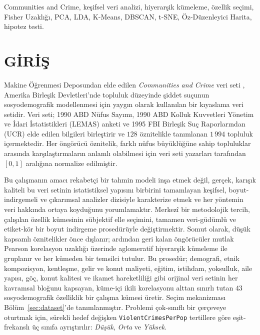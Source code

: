 \documentclass{ieeeaccess}
\begin{document}
\begin{keywords}
Communities and Crime, keşifsel veri analizi, hiyerarşik kümeleme, özellik seçimi, Fisher Uzaklığı, PCA, LDA, K-Means, DBSCAN, t-SNE, Öz-Düzenleyici Harita, hipotez testi.
\end{keywords}

\titlepgskip=-21pt
\maketitle

\section{GİRİŞ}
\label{sec:introduction}
 Makine Öğrenmesi Deposundan elde edilen \emph{Communities and Crime} veri seti \cite{uciccrime}, Amerika Birleşik Devletleri'nde topluluk düzeyinde şiddet suçunun sosyodemografik modellenmesi için yaygın olarak kullanılan bir kıyaslama veri setidir. Veri seti; 1990 ABD Nüfus Sayımı, 1990 ABD Kolluk Kuvvetleri Yönetim ve İdari İstatistikleri (LEMAS) anketi ve 1995 FBI Birleşik Suç Raporlarından (UCR) elde edilen bilgileri birleştirir \cite{redmondbaveja} ve $128$ öznitelikle tanımlanan $1\,994$ topluluk içermektedir. Her öngörücü öznitelik, farklı nüfus büyüklüğüne sahip topluluklar arasında karşılaştırmaların anlamlı olabilmesi için veri seti yazarları tarafından $[0,1]$ aralığına normalize edilmiştir.

Bu çalışmanın amacı rekabetçi bir tahmin modeli inşa etmek değil, gerçek, karışık kaliteli bu veri setinin istatistiksel yapısını birbirini tamamlayan keşifsel, boyut-indirgemeli ve çıkarımsal analizler dizisiyle karakterize etmek ve her yöntemin veri hakkında ortaya koyduğunu yorumlamaktır. Merkezî bir metodolojik tercih, çalışılan özellik kümesinin sübjektif elle seçimini, tamamen veri-güdümlü ve etiket-kör bir boyut indirgeme prosedürüyle değiştirmektir. Somut olarak, düşük kapsamlı öznitelikler önce dışlanır; ardından geri kalan öngörücüler mutlak Pearson korelasyon uzaklığı üzerinde aglomeratif hiyerarşik kümeleme ile gruplanır ve her kümeden bir temsilci tutulur. Bu prosedür; demografi, etnik kompozisyon, kentleşme, gelir ve konut maliyeti, eğitim, istihdam, yoksulluk, aile yapısı, göç, konut kalitesi ve ikamet hareketliliği gibi orijinal veri setinin her kavramsal bloğunu kapsayan, küme-içi ikili korelasyonu alttan sınırlı tutan $43$ sosyodemografik özelliklik bir çalışma kümesi üretir. Seçim mekanizması Bölüm~\ref{sec:dataset}'de tanımlanmıştır. Problemi çok-sınıflı bir çerçeveye oturtmak için, sürekli hedef değişken \texttt{ViolentCrimesPerPop} tertillere göre eşit-frekanslı üç sınıfa ayrıştırılır: \emph{Düşük}, \emph{Orta} ve \emph{Yüksek}.
\end{document}
